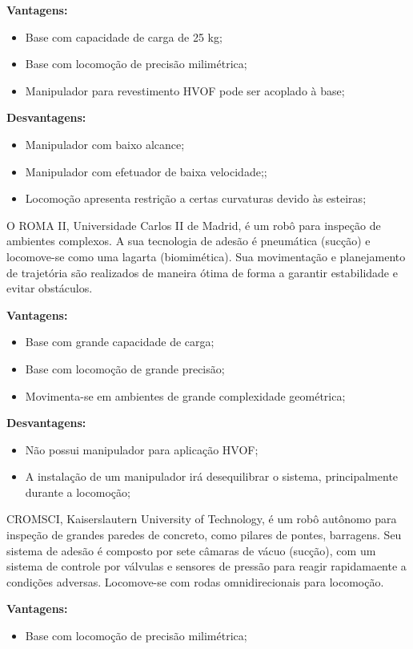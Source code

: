 \textbf{Vantagens:}
\begin{itemize}
  \item Base com capacidade de carga de 25 kg;
  \item Base com locomoção de precisão milimétrica;
  \item Manipulador para revestimento HVOF pode ser acoplado à base; 
\end{itemize}

\textbf{Desvantagens:}
\begin{itemize}
  \item Manipulador com baixo alcance;
  \item Manipulador com efetuador de baixa velocidade;;
  \item Locomoção apresenta restrição a certas curvaturas devido às esteiras;
\end{itemize}

O ROMA II, Universidade Carlos II de Madrid, é um robô para inspeção de
ambientes complexos. A sua tecnologia de adesão é pneumática (sucção) e
locomove-se como uma lagarta (biomimética). Sua movimentação e planejamento de
trajetória são realizados de maneira ótima de forma a garantir estabilidade e
evitar obstáculos. 

\textbf{Vantagens:}
\begin{itemize}
  \item Base com grande capacidade de carga;
  \item Base com locomoção de grande precisão;
  \item Movimenta-se em ambientes de grande complexidade geométrica; 
\end{itemize}

\textbf{Desvantagens:}
\begin{itemize}
  \item Não possui manipulador para aplicação HVOF;
  \item A instalação de um manipulador irá desequilibrar o sistema,
  principalmente durante a locomoção;
\end{itemize}


CROMSCI, Kaiserslautern University of Technology, é um robô autônomo para
inspeção de grandes paredes de concreto, como pilares de pontes, barragens. Seu
sistema de adesão é composto por sete câmaras de vácuo (sucção), com um sistema
de controle por válvulas e sensores de pressão para reagir rapidamaente a
condições adversas. Locomove-se com rodas omnidirecionais para locomoção.

\textbf{Vantagens:}
\begin{itemize}
  \item Base com locomoção de precisão milimétrica; 
\end{itemize}

